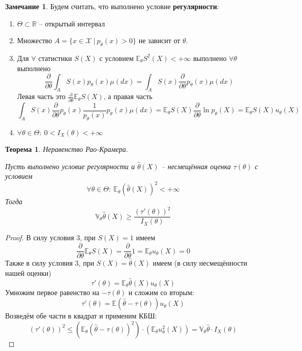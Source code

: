 \documentclass[a4paper,12pt]{article}
\renewcommand{\leq}{\ensuremath{\leqslant}}
\renewcommand{\geq}{\ensuremath{\geqslant}}
\theoremstyle{plain}
\newtheorem{theorem}{Теорема}[section]
\theoremstyle{definition}
\newtheorem*{note}{Замечание}
\theoremstyle{remark}
\begin{document}
\begin{note}
  Будем считать, что выполнено условие \textbf{регулярности}:
  \begin{enumerate}
    \item $\Theta \subset \mathbb{R}$ -- открытый интервал
    \item Множество $A = \{x \in \mathcal{X} \:\vert\: p_\theta(x) > 0\}$ не зависит от $\theta$.
    \item Для $\forall$ статистики $S(X)$ с условием $\mathbb{E}_\theta S^2(X) < +\infty$ выполнено $\forall \theta$ выполнено 
    \[
      \frac{\partial}{\partial\theta}\int_AS(x)p_\theta(x)\mu(dx) = \int_AS(x)\frac{\partial}{\partial \theta}p_\theta(x)\mu(dx)
    \]
    Левая часть это $\frac{\partial}{\partial\theta}\mathbb{E}_\theta S(X)$, а правая часть
    \[
      \int_AS(x)\frac{\partial}{\partial \theta}p_\theta(x)\frac{1}{p_\theta(x)}p_\theta(x)\mu(dx) = \mathbb{E}_\theta S(X)\frac{\partial}{\partial\theta}\ln p_\theta(X) = \mathbb{E}_\theta S(X)u_\theta(X)
    \]
    \item $\forall \theta \in \Theta:\:0 < I_X(\theta) < +\infty$
  \end{enumerate}
\end{note}

\begin{theorem}
  Неравенство Рао-Крамера.

  Пусть выполнено условие регулярности и $\hat{\theta}(X)$ -- несмещённая оценка $\tau(\theta)$ с условием 
  \[
    \forall \theta \in \Theta:\:\mathbb{E}_\theta(\hat{\theta}(X))^2 < +\infty
  \]
  Тогда
  \[
    \mathbb{V}_\theta\hat{\theta}(X) \geq \frac{(\tau'(\theta))^2}{I_X(\theta)}
  \]
\end{theorem}

\begin{proof}
  В силу условия 3, при $S(X) = 1$ имеем
  \[
    \frac{\partial}{\partial\theta}\mathbb{E}_\theta S(X) = \frac{\partial}{\partial\theta}1 = \mathbb{E}_\theta u_\theta(X) = 0
  \]
  Также в силу условия 3, при $S(X) = \hat{\theta}(X)$ имеем (в силу несмещённости нашей оценки)
  \[
    \tau'(\theta) = \mathbb{E}_\theta\hat{\theta}(X)u_\theta(X)
  \]
  Умножим первое равенство на $-\tau(\theta)$ и сложим со вторым:
  \[
    \tau'(\theta) = \mathbb{E}(\hat{\theta} - \tau(\theta))u_\theta(X)
  \]
  Возведём обе части в квадрат и применим КБШ:
  \[
    (\tau'(\theta))^2 \leq \left(\mathbb{E}_\theta(\hat{\theta} - \tau(\theta))^2\right)\cdot\left(\mathbb{E}_\theta u_\theta^2(X)\right) = \mathbb{V}_\theta\hat{\theta}\cdot I_X(\theta)
  \]
\end{proof}
\end{document}
